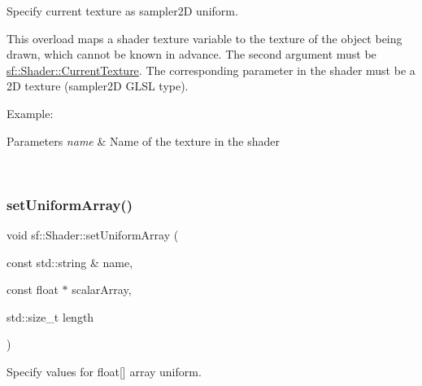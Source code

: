 Specify current texture as {\ttfamily sampler2D} uniform. 

This overload maps a shader texture variable to the texture of the object being drawn, which cannot be known in advance. The second argument must be \mbox{\hyperlink{classsf_1_1_shader_ac84c7953eec2e19358ea6e2cc5385b8d}{sf\+::\+Shader\+::\+Current\+Texture}}. The corresponding parameter in the shader must be a 2D texture ({\ttfamily sampler2D} G\+L\+SL type).

Example\+: 
\begin{DoxyCode}{0}
\end{DoxyCode}
 
\begin{DoxyCode}{0}
\end{DoxyCode}



\begin{DoxyParams}{Parameters}
{\em name} & Name of the texture in the shader \begin{DoxyVerb}\end{DoxyVerb}
 \\
\hline
\end{DoxyParams}
\mbox{\label{classsf_1_1_shader_a731d3b9953c50fe7d3fb03340b97deff}} 
\subsubsection{\texorpdfstring{setUniformArray()}{setUniformArray()}\hspace{0.1cm}{\footnotesize\ttfamily [1/6]}}
{\footnotesize\ttfamily void sf\+::\+Shader\+::set\+Uniform\+Array (\begin{DoxyParamCaption}\item[{const std\+::string \&}]{name,  }\item[{const float $\ast$}]{scalar\+Array,  }\item[{std\+::size\+\_\+t}]{length }\end{DoxyParamCaption})}



Specify values for {\ttfamily float}\mbox{[}\mbox{]} array uniform. 


